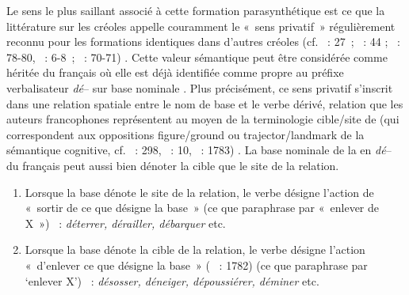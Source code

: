 \documentclass[output=paper]{langsci/langscibook}
\begin{document}
\largerpage[-1]
Le sens le plus saillant associé à cette formation parasynthétique est
ce que la littérature sur les créoles appelle couramment le «~sens
privatif~» régulièrement reconnu pour les formations identiques dans
d'autres créoles %
(cf. %
\citealt{Chaudenson96}
~: 27~; %
\citealt{Filipovich87}
~: 44 ; %
\citealt{DeGraff2001}
~: 78-80, %
\citealt{Lefebvre2003}
~: 6-8~; %
\citealt{Brousseau11}
~: 70-71)%
%
.
Cette valeur sémantique peut être considérée comme héritée du français
où elle est déjà identifiée comme propre au préfixe verbalisateur
\emph{dé}-- sur base nominale %
\citep[cf. ][62--63 et 252, par exemple]{Corbin87}%
%
. Plus précisément, ce sens privatif s'inscrit dans une relation
spatiale entre le nom de base et le verbe dérivé, relation que les
auteurs francophones représentent au moyen de la terminologie cible/site
de %
\citealt{Vandeloise1986} %
%
(qui correspondent aux oppositions figure/ground ou trajector/landmark de la sémantique cognitive, cf.  %
\citealt{Fradin2003}%
~: 298, %
\citealt{Amiot08}%
~: 10, %
\citealt{Jalenques2014}%
~: 1783)%
%
. La base nominale de la
 en \emph{dé}-- du français peut aussi bien dénoter la cible
que le site de la relation.

\begin{enumerate}\def\labelenumi{(\roman{enumi})}

\item
  Lorsque la base dénote le site de la relation, le verbe désigne
  l'action de «~sortir de ce que désigne la base~» %
\citep[1782]{Jalenques2014} %
%
(ce que %
\citealt{Corbin87} %
%
 paraphrase par «~enlever de X~»)
%
~:
  \emph{déterrer, dérailler, débarquer }etc.
\item
  Lorsque la base dénote la cible de la relation, le verbe désigne
  l'action «~d'enlever ce que désigne la base~» (%
\citealt{Jalenques2014}%
~: 1782)
(ce que %
\citealt{Corbin87}  %
%
paraphrase par `enlever X')
%
~: \emph{désosser,
  déneiger, dépoussiérer, déminer} etc.
\end{enumerate}
\end{document}
